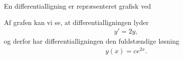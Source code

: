 \newpage
\begin{exa}
	En differentialligning er repræsenteret grafisk ved
	\begin{center}
	\end{center}
	Af grafen kan vi se, at differentialligningen lyder
	\begin{align*}
		y' = 2y,
	\end{align*}
	og derfor har differentialligningen den fuldstændige løsning
	\begin{align*}
		y(x) = ce^{2x}.
	\end{align*}
\end{exa}


